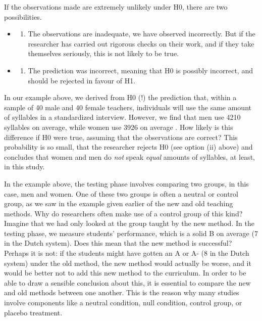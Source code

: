 \documentclass[
]{book}
\providecommand{\tightlist}{%
  \setlength{\itemsep}{0pt}\setlength{\parskip}{0pt}}
\begin{document}
If the observations made are extremely unlikely under H0, there are two possibilities.

\begin{itemize}
\item
  \begin{enumerate}
  \def\labelenumi{(\roman{enumi})}
  \tightlist
  \item
    The observations are inadequate, we have observed incorrectly. But if the researcher has carried out rigorous checks on their work, and if they take themselves seriously, this is not likely to be true.
  \end{enumerate}
\item
  \begin{enumerate}
  \def\labelenumi{(\roman{enumi})}
  \setcounter{enumi}{1}
  \tightlist
  \item
    The prediction was incorrect, meaning that H0 is possibly incorrect, and should be rejected in favour of H1.
  \end{enumerate}
\end{itemize}

In our example above, we derived from H0 (!) the prediction that, within a sample of 40 male and 40 female teachers, individuals will use the same amount of syllables in a standardized interview. However, we find that men use 4210 syllables on average, while women use 3926 on average \citep[p.1112]{Quene08}. How likely is this difference if H0 were true, assuming that the observations are correct? This probability is so small, that the researcher rejects H0 (see option (ii) above) and concludes that women and men do \emph{not} speak \emph{equal} amounts of syllables, at least, in this study.

In the example above, the testing phase involves comparing two groups, in this case, men and women. One of these two groups is often a neutral or control group, as we saw in the example given earlier of the new and old teaching methods. Why do researchers often make use of a control group of this kind? Imagine that we had only looked at the group taught by the new method. In the testing phase, we measure students' performance, which is a solid B on average (7 in the Dutch system). Does this mean that the new method is successful? Perhaps it is not: if the students might have gotten an A or A- (8 in the Dutch system) under the old method, the new method would actually be worse, and it would be better not to add this new method to the curriculum. In order to be able to draw a sensible conclusion about this, it is essential to compare the new and old methods between one another. This is the reason why many studies involve components like a neutral condition, null condition, control group, or placebo treatment.
\end{document}
